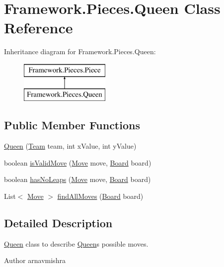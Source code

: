 \hypertarget{class_framework_1_1_pieces_1_1_queen}{}\section{Framework.\+Pieces.\+Queen Class Reference}
\label{class_framework_1_1_pieces_1_1_queen}
Inheritance diagram for Framework.\+Pieces.\+Queen\+:\begin{figure}[H]
\begin{center}
\leavevmode
\includegraphics[height=2.000000cm]{class_framework_1_1_pieces_1_1_queen}
\end{center}
\end{figure}
\subsection*{Public Member Functions}
\begin{DoxyCompactItemize}
\item 
\hyperlink{class_framework_1_1_pieces_1_1_queen_a017f9ef7c69a9e0b7aadbd301889e465}{Queen} (\hyperlink{class_framework_1_1_team}{Team} team, int x\+Value, int y\+Value)
\item 
boolean \hyperlink{class_framework_1_1_pieces_1_1_queen_a213565b77c920684dd25ac214ea9b3e4}{is\+Valid\+Move} (\hyperlink{class_framework_1_1_move}{Move} move, \hyperlink{class_framework_1_1_board}{Board} board)
\item 
boolean \hyperlink{class_framework_1_1_pieces_1_1_queen_a1225c0571579e119629d51ea7366271f}{has\+No\+Leaps} (\hyperlink{class_framework_1_1_move}{Move} move, \hyperlink{class_framework_1_1_board}{Board} board)
\item 
List$<$ \hyperlink{class_framework_1_1_move}{Move} $>$ \hyperlink{class_framework_1_1_pieces_1_1_queen_a44f0f2dcf3894f0538131e8a7645ab35}{find\+All\+Moves} (\hyperlink{class_framework_1_1_board}{Board} board)
\end{DoxyCompactItemize}


\subsection{Detailed Description}
\hyperlink{class_framework_1_1_pieces_1_1_queen}{Queen} class to describe \hyperlink{class_framework_1_1_pieces_1_1_queen}{Queen}\textquotesingle{}s possible moves. \begin{DoxyAuthor}{Author}
arnavmishra 
\end{DoxyAuthor}


